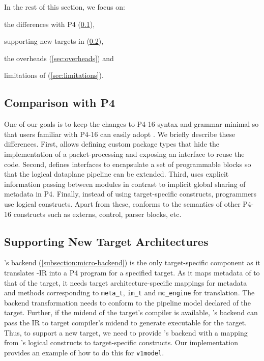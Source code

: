\documentclass[letterpaper,twocolumn,10pt]{article}
\begin{document}
In the rest of this section, we focus on:
\begin{enumerate*}[label=(\roman*)]
  \item the differences with P4 (\cref{sec:comparison}),
  \item supporting new targets in \ucomp (\cref{sec:new-target}),
  \item the overheads (\cref{sec:overheads}) and
  \item limitations of \ulang (\cref{sec:limitations}).
\end{enumerate*}


\subsection{Comparison with P4}
\label{sec:comparison}
One of our goals is to keep the changes to P4-16 syntax and grammar
minimal so that users familiar with P4-16 can easily adopt \ulang. We
briefly describe these differences. First, \ulang allows defining
custom package types that hide the implementation of a
packet-processing and exposing an interface to reuse the code. Second,
\uarch defines interfaces to encapsulate a set of programmable blocks
so that the logical dataplane pipeline can be extended. Third, \uarch
uses explicit information passing between modules in contrast to
implicit global sharing of metadata in P4.  Finally, instead of using
target-specific constructs, programmers use logical \uarch constructs.
Apart from these, \ulang conforms to the semantics of other P4-16
constructs such as externs, control, parser blocks, etc.






\subsection{Supporting New Target Architectures}
\label{sec:new-target}
 \ucomp's  backend
(\cref{subsection:micro-backend}) is the only target-specific
component as it translates \uarch-IR into a P4 program for a
specified target. As it maps metadata of \uarch to that of the target,
it needs target architecture-specific mappings for metadata and
methods corresponding to \texttt{meta\_t}, \texttt{im\_t} and
\texttt{mc\_engine} for translation. The backend transformation needs
to conform to the pipeline model declared of the target. Further, if
the midend of the target's compiler is available, \ucomp's backend can
pass the IR to target compiler's midend to generate executable for the
target. Thus, to support a new target, we need to provide \ucomp's
backend with a mapping from \uarch's logical constructs to
target-specific constructs. Our implementation provides an example of
how to do this for \texttt{v1model}.
\end{document}
